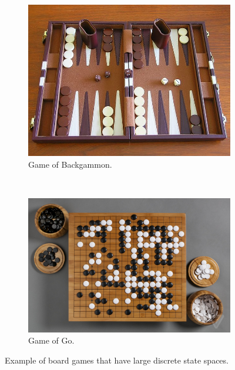 \begin{figure}[ht]
    \centering
   \begin{subfigure}[b]{0.45\textwidth}
            \centering
           \includegraphics[height=0.75\textwidth]{Chapter2/backgammon_board.jpg}
           \caption{Game of Backgammon.}
   \end{subfigure}
   ~~
    \begin{subfigure}[b]{0.45\textwidth}
            \centering
            \includegraphics[height=0.75\textwidth]{Chapter2/go_board.png}
            \caption{Game of Go.}
   \end{subfigure}
   \caption{Example of board games that have large discrete state spaces.}
  \label{fig:games}
\end{figure}


